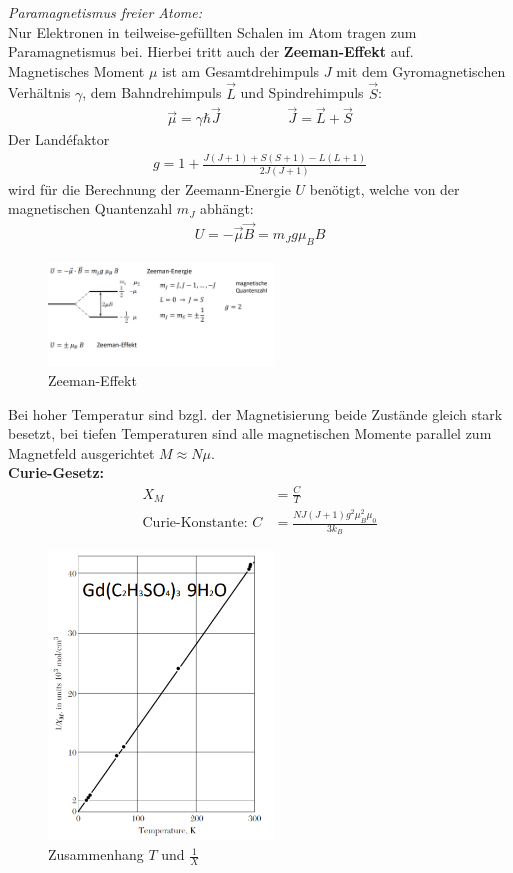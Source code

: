\textit{Paramagnetismus freier Atome:} \\
Nur Elektronen in teilweise-gefüllten Schalen im Atom tragen zum Paramagnetismus bei. Hierbei tritt auch der \textbf{Zeeman-Effekt} auf. \\
Magnetisches Moment $\mu$ ist am Gesamtdrehimpuls $J$ mit dem Gyromagnetischen Verhältnis $\gamma$, dem Bahndrehimpuls $\vec{L}$ und Spindrehimpuls $\vec{S}$:
\begin{align}
    \Vec{\mu} = \gamma \hbar \vec{J} \hspace{2cm} \vec{J} = \vec{L} + \vec{S}
\end{align}
Der Landéfaktor 
\begin{align}
    g = 1 + \frac{J(J+1) + S(S+1) - L(L+1)}{2J(J+1)}
\end{align}
  wird für die Berechnung der Zeemann-Energie $U$ benötigt, welche von der magnetischen Quantenzahl $m_J$ abhängt:
  \begin{align}
      U = - \vec{\mu} \vec{B} = m_J g \mu_B B
  \end{align}
\begin{figure}[H]
    \centering
    \includegraphics[width=6cm]{resources/05-05-2015/Frage32_Zeeman-Effekt.PNG}
    \caption{Zeeman-Effekt}
\end{figure}

Bei hoher Temperatur sind bzgl. der Magnetisierung beide Zustände gleich stark besetzt, bei tiefen Temperaturen sind alle magnetischen Momente parallel zum Magnetfeld ausgerichtet $M \approx N \mu$. \bigskip \\

\textbf{Curie-Gesetz:}
\begin{align}
    X_M& = \frac{C}{T} \\
    \mbox{Curie-Konstante: }C& = \frac{N J ( J+1) g^2 \mu_B^2 \mu_0}{3 k_B}
\end{align} \bigskip
\begin{figure}[H]
    \centering
    \includegraphics[width=6cm]{resources/05-05-2015/Frage32_Zsmhang_T_X.PNG}
    \caption{Zusammenhang $T$ und $\frac{1}{X}$}
\end{figure}


